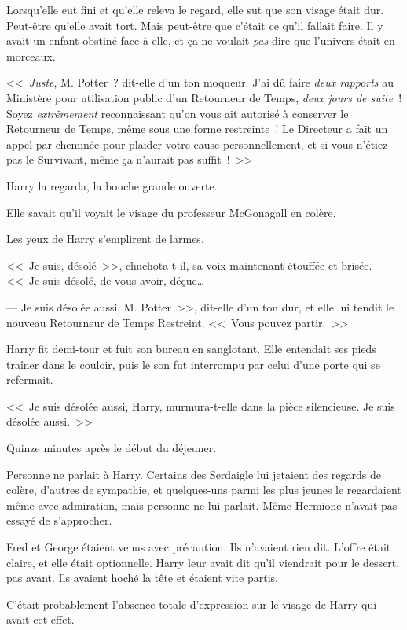 Lorsqu'elle eut fini et qu'elle releva le regard, elle sut que son visage était dur. Peut-être qu'elle avait tort. Mais peut-être que c'était ce qu'il fallait faire. Il y avait un enfant obstiné face à elle, et ça ne voulait \emph{pas} dire que l'univers était en morceaux.

<<~\emph{Juste}, M. Potter~? dit-elle d'un ton moqueur. J'ai dû faire \emph{deux rapports} au Ministère pour utilisation public d'un Retourneur de Temps, \emph{deux jours de suite}~! Soyez \emph{extrêmement} reconnaissant qu'on vous ait autorisé à conserver le Retourneur de Temps, même sous une forme restreinte~! Le Directeur a fait un appel par cheminée pour plaider votre cause personnellement, et si vous n'étiez pas le Survivant, même ça n'aurait pas suffit~!~>>

Harry la regarda, la bouche grande ouverte.

Elle savait qu'il voyait le visage du professeur McGonagall en colère.

Les yeux de Harry s'emplirent de larmes.

<<~Je suis, désolé~>>, chuchota-t-il, sa voix maintenant étouffée et brisée. <<~Je suis désolé, de vous avoir, déçue…

--- Je suis désolée aussi, M. Potter~>>, dit-elle d'un ton dur, et elle lui tendit le nouveau Retourneur de Temps Restreint. <<~Vous pouvez partir.~>>

Harry fit demi-tour et fuit son bureau en sanglotant. Elle entendait ses pieds traîner dans le couloir, puis le son fut interrompu par celui d'une porte qui se refermait.

<<~Je suis désolée aussi, Harry, murmura-t-elle dans la pièce silencieuse. Je suis désolée aussi.~>>

\later

Quinze minutes après le début du déjeuner.

Personne ne parlait à Harry. Certains des Serdaigle lui jetaient des regards de colère, d'autres de sympathie, et quelques-uns parmi les plus jeunes le regardaient même avec admiration, mais personne ne lui parlait. Même Hermione n'avait pas essayé de s'approcher.

Fred et George étaient venus avec précaution. Ils n'avaient rien dit. L'offre était claire, et elle était optionnelle. Harry leur avait dit qu'il viendrait pour le dessert, pas avant. Ils avaient hoché la tête et étaient vite partis.

C'était probablement l'absence totale d'expression sur le visage de Harry qui avait cet effet.

